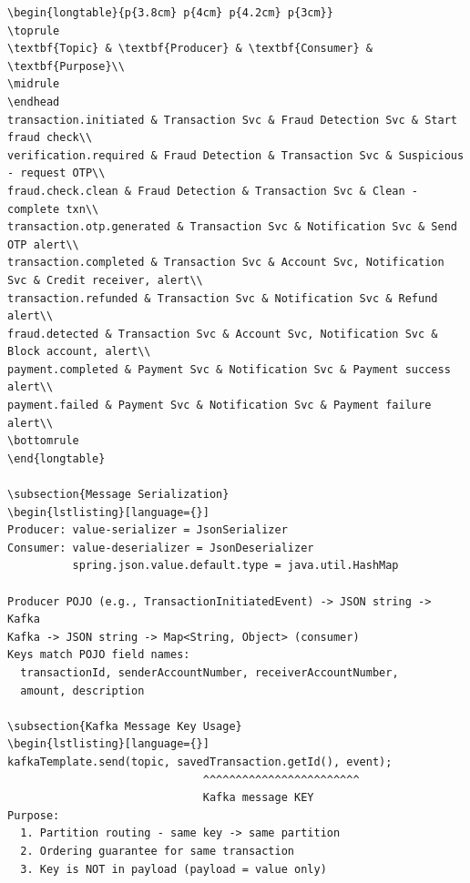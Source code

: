 \documentclass[12pt,a4paper]{article}
\begin{document}
\begin{lstlisting}[language={}]
\begin{longtable}{p{3.8cm} p{4cm} p{4.2cm} p{3cm}}
\toprule
\textbf{Topic} & \textbf{Producer} & \textbf{Consumer} & \textbf{Purpose}\\
\midrule
\endhead
transaction.initiated & Transaction Svc & Fraud Detection Svc & Start fraud check\\
verification.required & Fraud Detection & Transaction Svc & Suspicious - request OTP\\
fraud.check.clean & Fraud Detection & Transaction Svc & Clean - complete txn\\
transaction.otp.generated & Transaction Svc & Notification Svc & Send OTP alert\\
transaction.completed & Transaction Svc & Account Svc, Notification Svc & Credit receiver, alert\\
transaction.refunded & Transaction Svc & Notification Svc & Refund alert\\
fraud.detected & Transaction Svc & Account Svc, Notification Svc & Block account, alert\\
payment.completed & Payment Svc & Notification Svc & Payment success alert\\
payment.failed & Payment Svc & Notification Svc & Payment failure alert\\
\bottomrule
\end{longtable}

\subsection{Message Serialization}
\begin{lstlisting}[language={}]
Producer: value-serializer = JsonSerializer
Consumer: value-deserializer = JsonDeserializer
          spring.json.value.default.type = java.util.HashMap

Producer POJO (e.g., TransactionInitiatedEvent) -> JSON string -> Kafka
Kafka -> JSON string -> Map<String, Object> (consumer)
Keys match POJO field names:
  transactionId, senderAccountNumber, receiverAccountNumber,
  amount, description

\subsection{Kafka Message Key Usage}
\begin{lstlisting}[language={}]
kafkaTemplate.send(topic, savedTransaction.getId(), event);
                              ^^^^^^^^^^^^^^^^^^^^^^^^
                              Kafka message KEY
Purpose:
  1. Partition routing - same key -> same partition
  2. Ordering guarantee for same transaction
  3. Key is NOT in payload (payload = value only)


\end{lstlisting}
\end{document}
